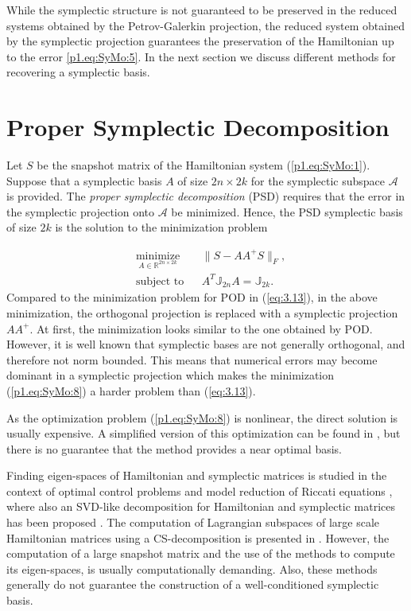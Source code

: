 While the symplectic structure is not guaranteed to be preserved in the reduced systems obtained by the Petrov-Galerkin projection, the reduced system obtained by the symplectic projection guarantees the preservation of the Hamiltonian up to the error \eqref{p1.eq:SyMo:5}. In the next section we discuss  different methods for recovering a symplectic basis.

\section{Proper Symplectic Decomposition} \label{p1.sec:SyMo.PrSy:1}

Let $S$ be the snapshot matrix of the Hamiltonian system (\ref{p1.eq:SyMo:1}). Suppose that a symplectic basis $A$ of size $2n\times2k$ for the symplectic subspace $\mathcal A$ is provided. The \emph{proper symplectic decomposition} (PSD) requires that the error in the symplectic projection onto $\mathcal A$ be minimized. Hence, the PSD symplectic basis of size $2k$ is the solution to the minimization problem

\begin{equation} \label{p1.eq:SyMo:8}
\begin{aligned}
& \underset{A\in \mathbb R^{2n\times 2k}}{\text{minimize}}
& & \| S - AA^+S\|_F, \\
& \text{subject to}
& & A^T \mathbb{J}_{2n}A = \mathbb{J}_{2k}.
\end{aligned}
\end{equation}
Compared to the minimization problem for POD in (\ref{eq:3.13}), in the above minimization, the orthogonal projection is replaced with a symplectic projection $AA^+$. At first, the minimization looks similar to the one obtained by POD. However, it is well known that symplectic bases are not generally orthogonal, and therefore not norm bounded. This means that numerical errors may become dominant in a symplectic projection \cite{doi:10.1137/050628519} which makes the minimization (\ref{p1.eq:SyMo:8}) a harder problem than (\ref{eq:3.13}).
	
As the optimization problem (\ref{p1.eq:SyMo:8}) is nonlinear, the direct solution is usually expensive. A simplified version of this optimization can be found in \cite{doi:10.1137/140978922}, but there is no guarantee that the method provides a near optimal basis.

Finding eigen-spaces of Hamiltonian and symplectic matrices is studied in the context of optimal control problems \cite{Benner:2000ww,benner1997new,watkins2004hamiltonian,bunse1986matrix} and model reduction of Riccati equations \cite{benner1997new}, where also an SVD-like decomposition for Hamiltonian and symplectic matrices has been proposed \cite{xu2003svd}. The computation of Lagrangian subspaces of large scale Hamiltonian matrices using a CS-decomposition is presented in \cite{mehrmann2016inverse,doi:10.1137/110850773}. However, the computation of a large snapshot matrix and the use of the methods to compute its eigen-spaces, is usually computationally demanding. Also, these methods generally do not guarantee the construction of a well-conditioned symplectic basis.

